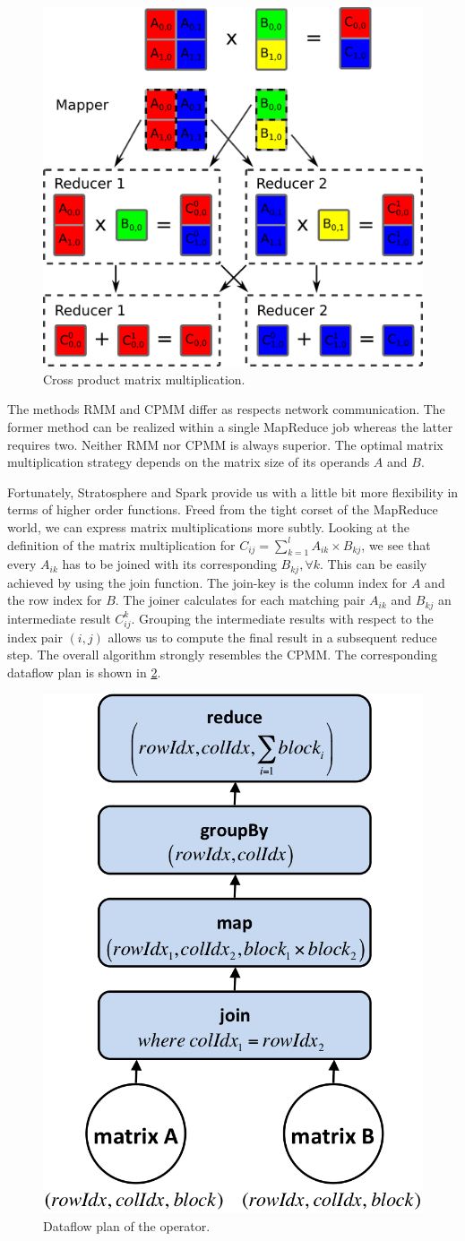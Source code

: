 \begin{figure}[!h]
	\centering
	\includegraphics[width=0.4\linewidth]{images/cpmm.png}
	\caption{Cross product matrix multiplication.}
	\label{fig:CPMM}
\end{figure}

The methods RMM and CPMM differ as respects network communication.
The former method can be realized within a single MapReduce job whereas the latter requires two.
Neither RMM nor CPMM is always superior.
The optimal matrix multiplication strategy depends on the matrix size of its operands $A$ and $B$.

Fortunately, Stratosphere and Spark provide us with a little bit more flexibility in terms of higher order functions.
Freed from the tight corset of the MapReduce world, we can express matrix multiplications more subtly.
Looking at the definition of the matrix multiplication for $C_{ij}=\sum_{k=1}^{l}A_{ik}\times B_{kj}$, we see that every $A_{ik}$ has to be joined with its corresponding $B_{kj},\forall k$.
This can be easily achieved by using the join function.
The join-key is the column index for $A$ and the row index for $B$.
The joiner calculates for each matching pair $A_{ik}$ and $B_{kj}$ an intermediate result $C_{ij}^k$.
Grouping the intermediate results with respect to the index pair $(i,j)$ allows us to compute the final result in a subsequent reduce step.
The overall algorithm strongly resembles the CPMM.
The corresponding dataflow plan is shown in \cref{fig:planMatrixMultiplication}.

\begin{figure}[!h]
	\centering
	\includegraphics[width=0.3\linewidth]{images/planMatrixMultiplication.png}
	\caption{Dataflow plan of the  operator.}
	\label{fig:planMatrixMultiplication}
\end{figure}

